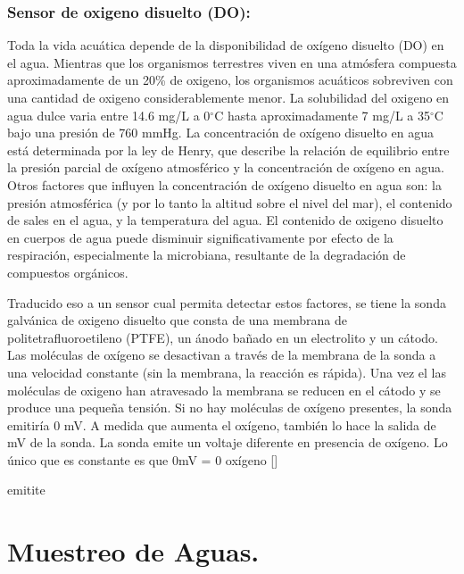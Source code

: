 \subsubsection{Sensor de oxigeno disuelto (DO):}
Toda la vida acuática depende de la disponibilidad de oxígeno disuelto (DO) en el agua. 
Mientras que los organismos terrestres viven en una atmósfera compuesta aproximadamente de un 20\% de oxigeno, los organismos acuáticos sobreviven con una cantidad de oxigeno considerablemente menor. 
La solubilidad del oxigeno en agua dulce varia entre 14.6 mg/L a 0$^{\circ}$C hasta aproximadamente 7 mg/L a 35$^{\circ}$C bajo una presión de 760 mmHg. La concentración de oxígeno disuelto en agua está determinada por la ley de Henry, que describe la relación de equilibrio entre la presión parcial de oxígeno atmosférico y la concentración de oxígeno en agua. 
Otros factores que influyen la concentración de oxígeno disuelto en agua son: la presión atmosférica (y por lo tanto la altitud sobre el nivel del mar), el contenido de sales en el agua, y la temperatura del agua. 
El contenido de oxigeno disuelto en cuerpos de agua puede disminuir significativamente por efecto de la respiración, especialmente la microbiana, resultante de la degradación de compuestos orgánicos. 

Traducido eso a un sensor cual permita detectar estos factores, se tiene la sonda galvánica de oxigeno disuelto que consta de una membrana de politetrafluoroetileno (PTFE), un ánodo bañado en un electrolito y un cátodo. 
Las mol\'eculas de oxígeno se desactivan a través de la membrana de la sonda a una velocidad constante (sin la membrana, la reacción es rápida). 
Una vez el las mol\'eculas de oxigeno han atravesado la membrana se reducen en el cátodo y se produce una pequeña tensión. 
Si no hay moléculas de oxígeno presentes, la sonda emitiría 0 mV. 
A medida que aumenta el ox\'igeno, tambi\'en lo hace la salida de mV de la sonda. La sonda emite un voltaje diferente en presencia de ox\'igeno. Lo \'unico que es constante es que 0mV = 0 ox\'igeno []

emitite







\section{Muestreo de Aguas.}



